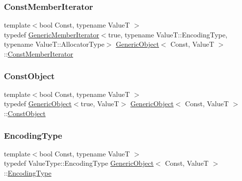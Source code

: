 \mbox{\label{classGenericObject_af16706c0ad32b957c56e7d0541628cd5}} 
\subsubsection{\texorpdfstring{Const\+Member\+Iterator}{ConstMemberIterator}}
{\footnotesize\ttfamily template$<$bool Const, typename ValueT $>$ \\
typedef \hyperlink{classGenericMemberIterator}{Generic\+Member\+Iterator}$<$true, typename Value\+T\+::\+Encoding\+Type, typename Value\+T\+::\+Allocator\+Type$>$ \hyperlink{classGenericObject}{Generic\+Object}$<$ Const, ValueT $>$\+::\hyperlink{classGenericObject_af16706c0ad32b957c56e7d0541628cd5}{Const\+Member\+Iterator}}

\mbox{\label{classGenericObject_aeee588f9a85e88cac89b7c4dfb6b0bd3}} 
\subsubsection{\texorpdfstring{Const\+Object}{ConstObject}}
{\footnotesize\ttfamily template$<$bool Const, typename ValueT $>$ \\
typedef \hyperlink{classGenericObject}{Generic\+Object}$<$true, ValueT$>$ \hyperlink{classGenericObject}{Generic\+Object}$<$ Const, ValueT $>$\+::\hyperlink{classGenericObject_aeee588f9a85e88cac89b7c4dfb6b0bd3}{Const\+Object}}

\mbox{\label{classGenericObject_a96ebfdde095e2ce42535d15ae5dc58ef}} 
\subsubsection{\texorpdfstring{Encoding\+Type}{EncodingType}}
{\footnotesize\ttfamily template$<$bool Const, typename ValueT $>$ \\
typedef Value\+Type\+::\+Encoding\+Type \hyperlink{classGenericObject}{Generic\+Object}$<$ Const, ValueT $>$\+::\hyperlink{classGenericObject_a96ebfdde095e2ce42535d15ae5dc58ef}{Encoding\+Type}}

